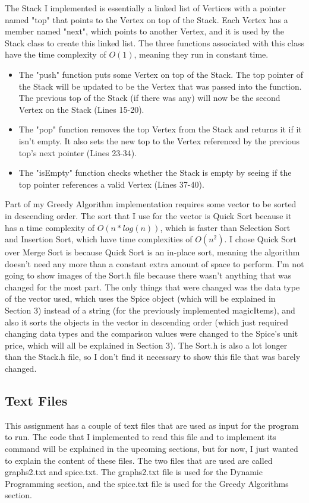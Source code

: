 \documentclass[letterpaper, 10pt]{article}
\begin{document}
\noindent
The Stack I implemented is essentially a linked list of Vertices with a pointer named "top" that points to the Vertex on top of the Stack. Each Vertex has a member named "next", which points to another Vertex, and it is used by the Stack class to create this linked list. The three functions associated with this class have the time complexity of $O(1)$, meaning they run in constant time. 
\noindent
\begin{itemize}
  \item The "push" function puts some Vertex on top of the Stack. The top pointer of the Stack will be updated to be the Vertex that was passed into the function. The previous top of the Stack (if there was any) will now be the second Vertex on the Stack (Lines 15-20).
  \item The "pop" function removes the top Vertex from the Stack and returns it if it isn't empty. It also sets the new top to the Vertex referenced by the previous top's next pointer (Lines 23-34).
  \item The "isEmpty" function checks whether the Stack is empty by seeing if the top pointer references a valid Vertex (Lines 37-40).
\end{itemize} 

\noindent
Part of my Greedy Algorithm implementation requires some vector to be sorted in descending order. The sort that I use for the vector is Quick Sort because it has a time complexity of $O(n * log(n))$, which is faster than Selection Sort and Insertion Sort, which have time complexities of $O(n^2)$. I chose Quick Sort over Merge Sort is because Quick Sort is an in-place sort, meaning the algorithm doesn't need any more than a constant extra amount of space to perform. I'm not going to show images of the Sort.h file because there wasn't anything that was changed for the most part. The only things that were changed was the data type of the vector used, which uses the Spice object (which will be explained in Section 3) instead of a string (for the previously implemented magicItems), and also it sorts the objects in the vector in descending order (which just required changing data types and the comparison values were changed to the Spice's unit price, which will all be explained in Section 3). The Sort.h is also a lot longer than the Stack.h file, so I don't find it necessary to show this file that was barely changed.

\vspace{5em}

\subsection{Text Files}
\noindent
This assignment has a couple of text files that are used as input for the program to run. The code that I implemented to read this file and to implement its command will be explained in the upcoming sections, but for now, I just wanted to explain the content of these files. The two files that are used are called graphs2.txt and spice.txt. The graphs2.txt file is used for the Dynamic Programming section, and the spice.txt file is used for the Greedy Algorithms section.
\end{document}
